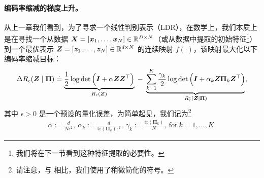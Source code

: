 \documentclass[../../book-main.tex]{subfiles}
\begin{document}
\paragraph{编码率缩减的梯度上升。} 从上一章我们看到，为了寻求一个线性判别表示（LDR），在数学上，我们本质上是在寻找一个从数据 $\bm{X} = [\bm{x}_1, \ldots, \bm{x}_N] \in \mathbb{R}^{D \times N}$（或从数据中提取的初始特征\footnote{我们将在下一节看到这种特征提取的必要性。}）到一个最优表示 $\bm{Z} = [\bm{z}_1, \ldots, \bm{z}_N] \in \mathbb{R}^{d \times N}$ 的连续映射 $f(\cdot)$，该映射最大化以下编码率缩减目标：
\begin{equation}\label{eq:mcr-formulation}
\begin{split}
\Delta R_{\epsilon}(\bm{Z} \mid \bm{\Pi}) \doteq \underbrace{\frac{1}{2}\log\det \Big(\bm{I} + {\alpha} \bm{Z} \bm{Z}^{\top} \Big)}_{R_{\epsilon}(\bm{Z})} \;-\; \underbrace{\sum_{k=1}^{K}\frac{\gamma_{k}}{2} \log\det\Big(\bm{I} + {\alpha_{k}} \bm{Z} \bm{\Pi}_{k} \bm{Z}^{\top} \Big)}_{R_{\epsilon}^c(\bm{Z} \mid \bm \Pi)},
\end{split}
\end{equation}
其中 $\epsilon > 0$ 是一个预设的量化误差，为简单起见，我们记为\footnote{请注意，与  相比，我们使用了稍微简化的符号。}
\begin{align*}
    \alpha := \frac{d}{N\epsilon^2},\ \alpha_{k} := \frac{d}{\mathrm{tr}(\bm{\Pi}_{k})\epsilon^2},\ \gamma_{k} := \frac{\mathrm{tr}(\bm{\Pi}_{k})}{N},\ \text{for}\ k = 1,\ldots, K.
\end{align*}
\end{document}
